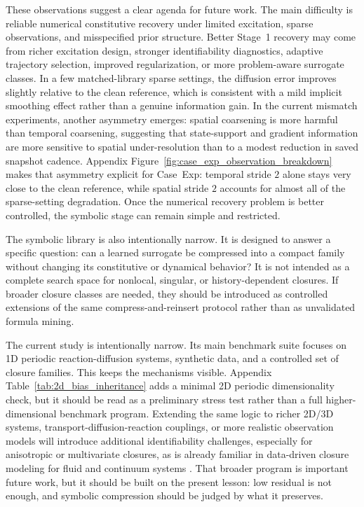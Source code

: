 \documentclass[preprint,12pt]{elsarticle}
\begin{document}
These observations suggest a clear agenda for future work. The main difficulty is reliable numerical constitutive recovery under limited excitation, sparse observations, and misspecified prior structure. Better Stage~1 recovery may come from richer excitation design, stronger identifiability diagnostics, adaptive trajectory selection, improved regularization, or more problem-aware surrogate classes. In a few matched-library sparse settings, the diffusion error improves slightly relative to the clean reference, which is consistent with a mild implicit smoothing effect rather than a genuine information gain. In the current mismatch experiments, another asymmetry emerges: spatial coarsening is more harmful than temporal coarsening, suggesting that state-support and gradient information are more sensitive to spatial under-resolution than to a modest reduction in saved snapshot cadence. Appendix Figure~\ref{fig:case_exp_observation_breakdown} makes that asymmetry explicit for Case~Exp: temporal stride $2$ alone stays very close to the clean reference, while spatial stride $2$ accounts for almost all of the sparse-setting degradation. Once the numerical recovery problem is better controlled, the symbolic stage can remain simple and restricted.

The symbolic library is also intentionally narrow. It is designed to answer a specific question: can a learned surrogate be compressed into a compact family without changing its constitutive or dynamical behavior? It is not intended as a complete search space for nonlocal, singular, or history-dependent closures. If broader closure classes are needed, they should be introduced as controlled extensions of the same compress-and-reinsert protocol rather than as unvalidated formula mining.

The current study is intentionally narrow. Its main benchmark suite focuses on 1D periodic reaction-diffusion systems, synthetic data, and a controlled set of closure families. This keeps the mechanisms visible. Appendix Table~\ref{tab:2d_bias_inheritance} adds a minimal 2D periodic dimensionality check, but it should be read as a preliminary stress test rather than a full higher-dimensional benchmark program. Extending the same logic to richer 2D/3D systems, transport-diffusion-reaction couplings, or more realistic observation models will introduce additional identifiability challenges, especially for anisotropic or multivariate closures, as is already familiar in data-driven closure modeling for fluid and continuum systems \cite{Duraisamy_2019,Brunton_2020}. That broader program is important future work, but it should be built on the present lesson: low residual is not enough, and symbolic compression should be judged by what it preserves.
\end{document}
